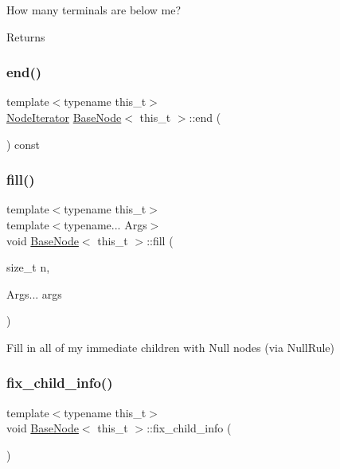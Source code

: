 How many terminals are below me? \begin{DoxyReturn}{Returns}

\end{DoxyReturn}
\mbox{\label{class_base_node_a990f4bbfab3e8c78421e51f32cb5db48}} 
\subsubsection{\texorpdfstring{end()}{end()}}
{\footnotesize\ttfamily template$<$typename this\+\_\+t$>$ \\
\hyperlink{class_base_node_1_1_node_iterator}{Node\+Iterator} \hyperlink{class_base_node}{Base\+Node}$<$ this\+\_\+t $>$\+::end (\begin{DoxyParamCaption}{ }\end{DoxyParamCaption}) const\hspace{0.3cm}{\ttfamily [inline]}}

\mbox{\label{class_base_node_aa7e88efda898c45f84ab0d79d4bb85c2}} 
\subsubsection{\texorpdfstring{fill()}{fill()}}
{\footnotesize\ttfamily template$<$typename this\+\_\+t$>$ \\
template$<$typename... Args$>$ \\
void \hyperlink{class_base_node}{Base\+Node}$<$ this\+\_\+t $>$\+::fill (\begin{DoxyParamCaption}\item[{size\+\_\+t}]{n,  }\item[{Args...}]{args }\end{DoxyParamCaption})\hspace{0.3cm}{\ttfamily [inline]}}

Fill in all of my immediate children with Null nodes (via Null\+Rule)\mbox{\label{class_base_node_ad0ef64be7c40f1e9f9170d8d51f8d3bf}} 
\subsubsection{\texorpdfstring{fix\+\_\+child\+\_\+info()}{fix\_child\_info()}}
{\footnotesize\ttfamily template$<$typename this\+\_\+t$>$ \\
void \hyperlink{class_base_node}{Base\+Node}$<$ this\+\_\+t $>$\+::fix\+\_\+child\+\_\+info (\begin{DoxyParamCaption}{ }\end{DoxyParamCaption})\hspace{0.3cm}{\ttfamily [inline]}}

